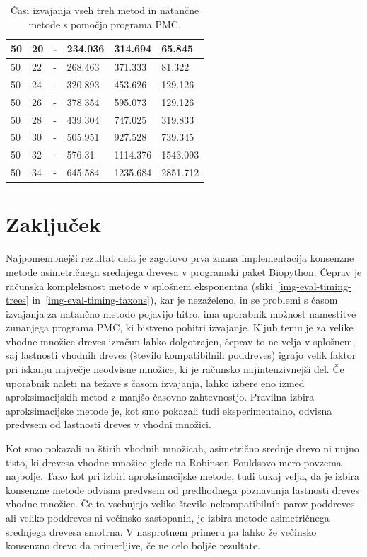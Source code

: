 \documentclass[a4paper, 12pt]{book}
\begin{document}
\begin{table}[h!]
\begin{center}
{\begin{tabular}{ l| l | l | l | l | l }
	50             & 20         & -           & 234.036   & 314.694   & 65.845      \\ \hline
	50             & 22         & -           & 268.463   & 371.333   & 81.322      \\ \hline
	50             & 24         & -           & 320.893   & 453.626   & 129.126     \\ \hline
	50             & 26         & -           & 378.354   & 595.073   & 129.126     \\ \hline
	50             & 28         & -           & 439.304   & 747.025   & 319.833     \\ \hline
	50             & 30         & -           & 505.951   & 927.528   & 739.345     \\ \hline
	50             & 32         & -           & 576.31    & 1114.376  & 1543.093    \\ \hline
	50             & 34         & -           & 645.584   & 1235.684  & 2851.712    \\ \hline
	\end{tabular}
	\label{table-eval-timing}
	\caption{
	 Časi izvajanja vseh treh metod in natančne metode s pomočjo programa PMC.
	 }
	}
	\end{center}		
\end{table}

\chapter{Zaključek}
Najpomembnejši rezultat dela je zagotovo prva znana implementacija konsenzne metode
asimetričnega srednjega drevesa v programski paket Biopython. Čeprav je računska 
kompleksnost metode v splošnem eksponentna (sliki~\ref{img-eval-timing-trees} 
in~\ref{img-eval-timing-taxons}), kar je nezaželeno, in se problemi s
časom izvajanja za natančno metodo pojavijo hitro, ima uporabnik možnost namestitve 
zunanjega programa PMC, ki bistveno pohitri izvajanje. Kljub temu je za velike vhodne 
množice dreves izračun lahko dolgotrajen, čeprav to ne velja v splošnem,
saj lastnosti vhodnih dreves (število kompatibilnih poddreves) igrajo velik faktor pri
iskanju največje neodvisne množice, ki je računsko najintenzivnejši del. Če 
uporabnik naleti na težave s časom izvajanja, lahko izbere eno izmed 
aproksimacijskih metod z manjšo časovno zahtevnostjo. Pravilna izbira 
aproksimacijske metode je, kot smo pokazali tudi eksperimentalno, odvisna 
predvsem od lastnosti dreves v vhodni množici. 

Kot smo pokazali na štirih vhodnih množicah, asimetrično srednje drevo ni nujno 
tisto, ki drevesa vhodne množice glede na Robinson-Fouldsovo mero povzema 
najbolje. Tako kot pri izbiri aproksimacijske metode, tudi tukaj velja, da 
je izbira konsenzne metode odvisna predvsem od predhodnega poznavanja lastnosti 
dreves vhodne množice. Če ta vsebujejo veliko število nekompatibilnih parov 
poddreves ali veliko poddreves ni večinsko zastopanih, je izbira metode 
asimetričnega srednjega drevesa smotrna. V nasprotnem primeru pa lahko že 
večinsko konsenzno drevo da primerljive, če ne celo boljše rezultate.
\end{document}
